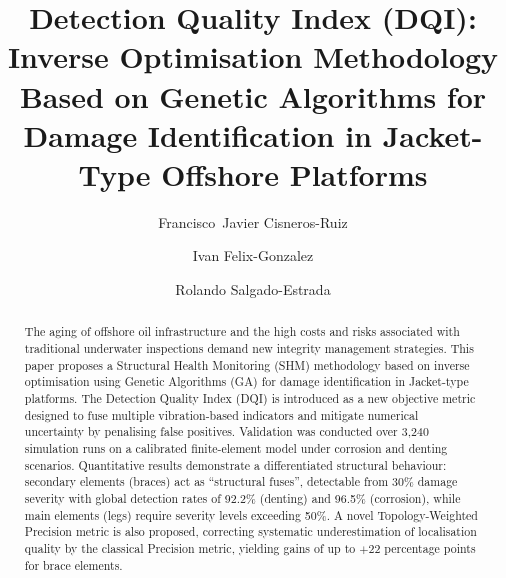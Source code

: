 \documentclass[preprint,12pt]{elsarticle}
\begin{document}
\begin{frontmatter}

\title{%
  Detection Quality Index (DQI): Inverse Optimisation Methodology
  Based on Genetic Algorithms for Damage Identification
  in Jacket-Type Offshore Platforms}

\author[1]{Francisco~Javier Cisneros-Ruiz}

\author[2]{Ivan Felix-Gonzalez}

\author[3]{Rolando Salgado-Estrada}


\begin{abstract}
The aging of offshore oil infrastructure and the high costs and risks
associated with traditional underwater inspections demand new integrity
management strategies. This paper proposes a Structural Health Monitoring
(SHM) methodology based on inverse optimisation using Genetic Algorithms
(GA) for damage identification in Jacket-type platforms. The Detection
Quality Index (DQI) is introduced as a new objective metric designed to
fuse multiple vibration-based indicators and mitigate numerical uncertainty by
penalising false positives. Validation was conducted over 3{,}240
simulation runs on a calibrated finite-element model under corrosion and
denting scenarios. Quantitative results demonstrate a differentiated
structural behaviour: secondary elements (braces) act as ``structural
fuses'', detectable from 30\% damage severity with global detection rates
of 92.2\% (denting) and 96.5\% (corrosion), while main elements (legs)
require severity levels exceeding 50\%. A novel Topology-Weighted
Precision metric is also proposed, correcting systematic underestimation
of localisation quality by the classical Precision metric, yielding gains
of up to $+$22 percentage points for brace elements.
\end{abstract}


\end{frontmatter}
\end{document}
